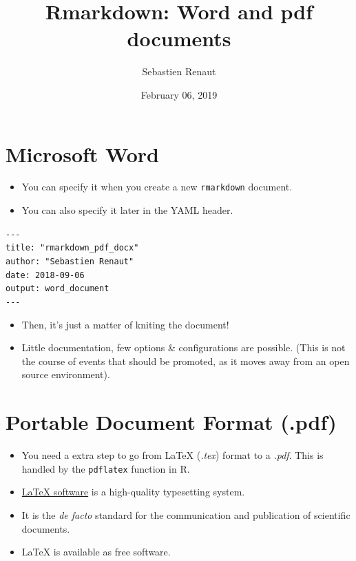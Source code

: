 \documentclass[]{article}
\title{Rmarkdown: Word and pdf documents}
\author{Sebastien Renaut}
\date{February 06, 2019}
\begin{document}
\maketitle

\section{Microsoft Word}\label{microsoft-word}

\begin{itemize}
\item
  You can specify it when you create a new \texttt{rmarkdown} document.
\item
  You can also specify it later in the YAML header.
\end{itemize}

\texttt{-\/-\/-}\\
\texttt{title:\ "rmarkdown\_pdf\_docx"}\\
\texttt{author:\ "Sebastien\ Renaut"}\\
\texttt{date:\ \textquotesingle{}2018-09-06\textquotesingle{}}\\
\texttt{output:\ word\_document}\\
\texttt{-\/-\/-}

\begin{itemize}
\item
  Then, it's just a matter of kniting the document!
\item
  Little documentation, few options \& configurations are possible.
  (This is not the course of events that should be promoted, as it moves
  away from an open source environment).
\end{itemize}

\section{Portable Document Format
(.pdf)}\label{portable-document-format-.pdf}

\begin{itemize}
\item
  You need a extra step to go from LaTeX (\emph{.tex}) format to a
  \emph{.pdf}. This is handled by the \texttt{pdflatex} function in R.
\item
  \href{https://www.latex-project.org}{LaTeX software} is a high-quality
  typesetting system.
\item
  It is the \emph{de facto} standard for the communication and
  publication of scientific documents.
\item
  LaTeX is available as free software.
\end{itemize}
\end{document}
